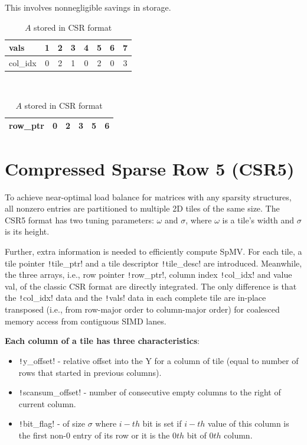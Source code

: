 \documentclass[thesis=M,english]{FITthesis}[2019/12/23]
\begin{document}
This involves nonnegligible savings in storage.

\begin{table}[h!]
    \centering
    \begin{tabular}{ |l||c|c|c|c|c|c|c| }
        \hline
        vals     & 1 & 2 & 3 & 4 & 5 & 6 & 7 \\
        \hline
        col\_idx & 0 & 2 & 1 & 0 & 2 & 0 & 3 \\
        \hline
    \end{tabular} \\
    \begin{tabular}{ |l||c|c|c|c|c| }
        \hline
        row\_ptr & 0 & 2 & 3 & 5 & 6 \\
        \hline
    \end{tabular}
    \caption{$A$ stored in CSR format}
\end{table}

\section{Compressed Sparse Row 5 (CSR5)}

\newcommand{\csre}[1]{\texttt!#1!}

To achieve near-optimal load balance for matrices with any sparsity structures,
all nonzero entries are partitioned to multiple 2D tiles of the same size.
The CSR5 format has two tuning parameters: $\omega$ and $\sigma$, where $\omega$
is a tile’s width and $\sigma$ is its height. \cite{liu2015csr5}

Further, extra information is needed to efficiently compute
SpMV. For each tile, a tile pointer \csre{tile_ptr} and a tile descriptor \csre{tile_desc} are introduced.
Meanwhile, the three arrays, i.e., row pointer \csre{row_ptr}, column index \csre{col_idx} and value val,
of the classic CSR format are directly integrated. The only difference is that the \csre{col_idx} data and the \csre{vals}
data in each complete tile are in-place transposed (i.e., from row-major order to column-major order) for coalesced memory access from contiguous SIMD lanes.

\textbf{Each column of a tile has three characteristics}:
\begin{itemize}
    \item \csre{y_offset} - relative offset into the Y for a column of tile (equal to number of rows that started in previous columns).
    \item \csre{scansum_offset} - number of consecutive empty columns to the right of current column.
    \item \csre{bit_flag} - of size $\sigma$ where $i-th$ bit is set if $i-th$ value of this column is the first non-0 entry of its row
          or it is the $0th$ bit of $0th$ column.
\end{itemize}
\end{document}
